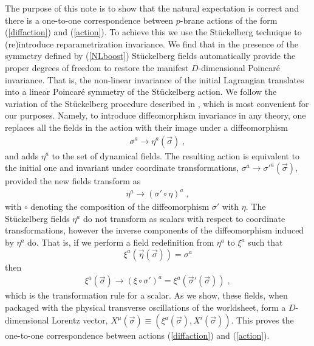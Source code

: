 \documentclass[%
 reprint,
 amsmath,amssymb,
 aps,
]{revtex4-1}
\begin{document}
The purpose of this note is to show that the natural expectation is correct and there is a one-to-one correspondence between $p$-brane actions
of the form (\ref{diffaction}) and (\ref{action}). To achieve this we use the St\"uckelberg technique
to (re)introduce reparametrization invariance. We find that in the presence of the symmetry defined by
(\ref{NLboost}) St\"uckelberg fields automatically provide the proper degrees of freedom to restore the
manifest $D$-dimensional Poincar\'e invariance. That is, the non-linear invariance of the initial
Lagrangian translates into a linear Poincar\'e symmetry of the St\"uckelberg action.
We follow the variation of the St\"uckelberg procedure described in
\cite{Dubovsky:2004sg}, which is most convenient for our purposes.
Namely, to introduce  diffeomorphism invariance in any theory, one
replaces all the fields in the action with their image under a diffeomorphism
\begin{eqnarray}
    \sigma^{a} \rightarrow \eta^{a}(\vec{\sigma}) \; , \nonumber
\end{eqnarray}
and adds $\eta^a$ to the set of dynamical fields. The resulting action is equivalent to the initial one and invariant under
coordinate transformations, $\sigma^a \rightarrow \sigma'^a(\vec{\sigma})$, provided the new fields transform as
\begin{eqnarray}
    \eta^{a} \rightarrow \left( \sigma' \circ \eta \right)^{a} \; , \nonumber
\end{eqnarray}
with $\circ$ denoting the composition of the diffeomorphism $\sigma'$ with $\eta$.
The St\"uckelberg fields $\eta^a$  do not transform as scalars with respect to coordinate transformations,
however  the inverse components of the diffeomorphism induced by $\eta^a$ do.  That is,
if we perform a field redefinition from $\eta^a$ to $\xi^{a}$ such that
\begin{equation}
\label{etadef}
\xi^{a}(\vec{\eta}(\vec{\sigma})) = \sigma^{a}
\end{equation}
 then
\begin{eqnarray}
    \xi^{a}(\vec{\sigma}) \rightarrow \left( \xi \circ \sigma' \right)^{a} = \xi^a(\vec{\sigma}'(\vec{\sigma})) \nonumber \; ,
\end{eqnarray}
which is the transformation rule for a scalar.
As we show, these fields, when packaged with the physical transverse oscillations
of the worldsheet, form a $D$-dimensional Lorentz vector,
$X^{\mu}(\vec{\sigma}) \equiv (\xi^a(\vec{\sigma}),X^i(\vec{\sigma}))$.
This proves the one-to-one correspondence between actions (\ref{diffaction}) and (\ref{action}).
\end{document}
